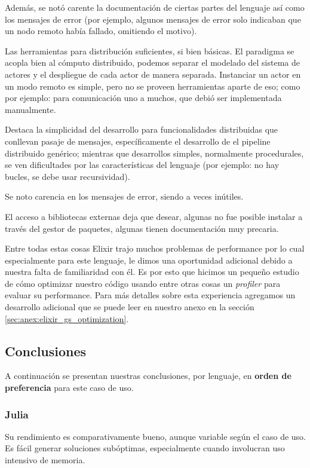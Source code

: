 \documentclass[11pt]{article}
\let\Oldsubsection\subsection
\renewcommand{\subsection}{\FloatBarrier\Oldsubsection}
\let\Oldsubsubsection\subsubsection
\renewcommand{\subsubsection}{\FloatBarrier\Oldsubsubsection}
\begin{document}
Además, se notó carente la documentación de ciertas partes del lenguaje así como los mensajes de error (por ejemplo, algunos mensajes de error solo indicaban que un nodo remoto había fallado, omitiendo el motivo).

Las herramientas para distribución suficientes, si bien básicas. El paradigma se acopla bien al cómputo distribuido, podemos separar el modelado del sistema de actores y el despliegue de cada actor  de manera separada. Instanciar un actor en un modo remoto es simple, pero no se proveen herramientas aparte de eso; como por ejemplo: para comunicación uno a muchos, que debió ser implementada manualmente.

Destaca la simplicidad del desarrollo para funcionalidades distribuidas que conllevan pasaje de mensajes, específicamente el desarrollo de el pipeline distribuido genérico; mientras que desarrollos simples, normalmente procedurales, se ven dificultades por las características del lenguaje (por ejemplo: no hay bucles, se debe usar recursividad).

Se noto carencia en los mensajes de error, siendo a veces inútiles.

El acceso a bibliotecas externas deja que desear, algunas no fue posible instalar a través del gestor de paquetes, algunas tienen documentación muy precaria.

Entre todas estas cosas Elixir trajo muchos problemas de performance por lo cual especialmente para este lenguaje, le dimos una oportunidad adicional debido a nuestra falta de familiaridad con él. Es por esto que hicimos un pequeño estudio de cómo optimizar nuestro código usando entre otras cosas un \textit{profiler} para evaluar su performance. Para más detalles sobre esta experiencia agregamos un desarrollo adicional que se puede leer en nuestro anexo en la sección \ref{sec:anex:elixir_gs_optimization}.

\subsection{Conclusiones}

A continuación se presentan nuestras conclusiones, por lenguaje, en \textbf{orden de preferencia} para este caso de uso.

\subsubsection{Julia}

Su rendimiento es comparativamente bueno, aunque variable según el caso de uso. Es fácil generar soluciones subóptimas, especialmente cuando involucran uso intensivo de memoria.
\end{document}
